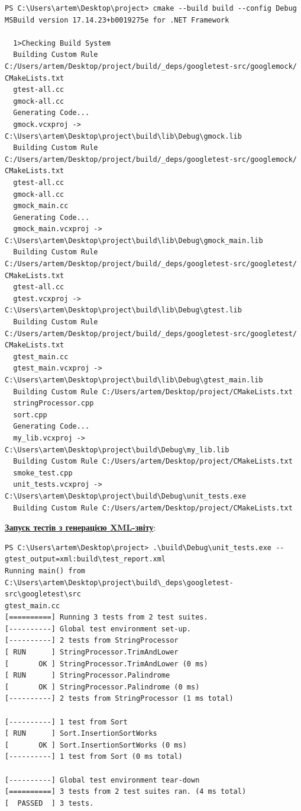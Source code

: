 \documentclass[12pt,a4paper]{article}
\begin{document}
    \begin{verbatim}
PS C:\Users\artem\Desktop\project> cmake --build build --config Debug
MSBuild version 17.14.23+b0019275e for .NET Framework

  1>Checking Build System
  Building Custom Rule C:/Users/artem/Desktop/project/build/_deps/googletest-src/googlemock/
CMakeLists.txt
  gtest-all.cc
  gmock-all.cc
  Generating Code...
  gmock.vcxproj -> C:\Users\artem\Desktop\project\build\lib\Debug\gmock.lib
  Building Custom Rule C:/Users/artem/Desktop/project/build/_deps/googletest-src/googlemock/
CMakeLists.txt
  gtest-all.cc
  gmock-all.cc
  gmock_main.cc
  Generating Code...
  gmock_main.vcxproj -> C:\Users\artem\Desktop\project\build\lib\Debug\gmock_main.lib
  Building Custom Rule C:/Users/artem/Desktop/project/build/_deps/googletest-src/googletest/
CMakeLists.txt
  gtest-all.cc
  gtest.vcxproj -> C:\Users\artem\Desktop\project\build\lib\Debug\gtest.lib
  Building Custom Rule C:/Users/artem/Desktop/project/build/_deps/googletest-src/googletest/
CMakeLists.txt
  gtest_main.cc
  gtest_main.vcxproj -> C:\Users\artem\Desktop\project\build\lib\Debug\gtest_main.lib
  Building Custom Rule C:/Users/artem/Desktop/project/CMakeLists.txt
  stringProcessor.cpp
  sort.cpp
  Generating Code...
  my_lib.vcxproj -> C:\Users\artem\Desktop\project\build\Debug\my_lib.lib
  Building Custom Rule C:/Users/artem/Desktop/project/CMakeLists.txt
  smoke_test.cpp
  unit_tests.vcxproj -> C:\Users\artem\Desktop\project\build\Debug\unit_tests.exe
  Building Custom Rule C:/Users/artem/Desktop/project/CMakeLists.txt
    \end{verbatim}

    \textbf{\underline{Запуск тестів з генерацією XML-звіту}}:

    \begin{verbatim}
PS C:\Users\artem\Desktop\project> .\build\Debug\unit_tests.exe --gtest_output=xml:build\test_report.xml
Running main() from C:\Users\artem\Desktop\project\build\_deps\googletest-src\googletest\src
gtest_main.cc
[==========] Running 3 tests from 2 test suites.
[----------] Global test environment set-up.
[----------] 2 tests from StringProcessor
[ RUN      ] StringProcessor.TrimAndLower
[       OK ] StringProcessor.TrimAndLower (0 ms)
[ RUN      ] StringProcessor.Palindrome
[       OK ] StringProcessor.Palindrome (0 ms)
[----------] 2 tests from StringProcessor (1 ms total)

[----------] 1 test from Sort
[ RUN      ] Sort.InsertionSortWorks
[       OK ] Sort.InsertionSortWorks (0 ms)
[----------] 1 test from Sort (0 ms total)

[----------] Global test environment tear-down
[==========] 3 tests from 2 test suites ran. (4 ms total)
[  PASSED  ] 3 tests.
    \end{verbatim}
\end{document}
